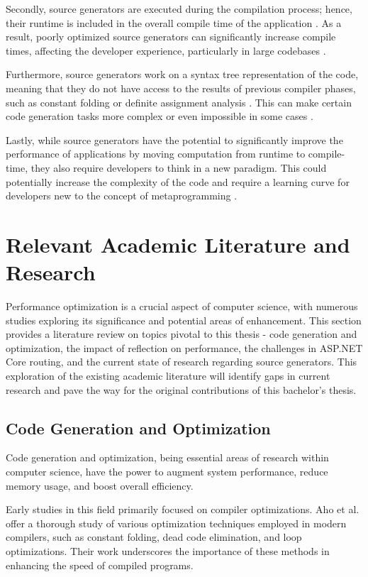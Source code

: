 Secondly, source generators are executed during the compilation process; hence, their runtime is included in the overall compile time of the application \cite{CSharpRoslyn}. As a result, poorly optimized source generators can significantly increase compile times, affecting the developer experience, particularly in large codebases \cite{Carter2020}.

Furthermore, source generators work on a syntax tree representation of the code, meaning that they do not have access to the results of previous compiler phases, such as constant folding or definite assignment analysis \cite{Torgersen2020}. This can make certain code generation tasks more complex or even impossible in some cases \cite{CSharpRoslyn}.

Lastly, while source generators have the potential to significantly improve the performance of applications by moving computation from runtime to compile-time, they also require developers to think in a new paradigm. This could potentially increase the complexity of the code and require a learning curve for developers new to the concept of metaprogramming \cite{CSharpRoslyn}.

\section{Relevant Academic Literature and Research}

Performance optimization is a crucial aspect of computer science, with numerous studies exploring its significance and potential areas of enhancement. This section provides a literature review on topics pivotal to this thesis - code generation and optimization, the impact of reflection on performance, the challenges in ASP.NET Core routing, and the current state of research regarding source generators. This exploration of the existing academic literature will identify gaps in current research and pave the way for the original contributions of this bachelor's thesis.

\subsection{Code Generation and Optimization}

Code generation and optimization, being essential areas of research within computer science, have the power to augment system performance, reduce memory usage, and boost overall efficiency.

Early studies in this field primarily focused on compiler optimizations. Aho et al. \cite{Aho2007} offer a thorough study of various optimization techniques employed in modern compilers, such as constant folding, dead code elimination, and loop optimizations. Their work underscores the importance of these methods in enhancing the speed of compiled programs.

